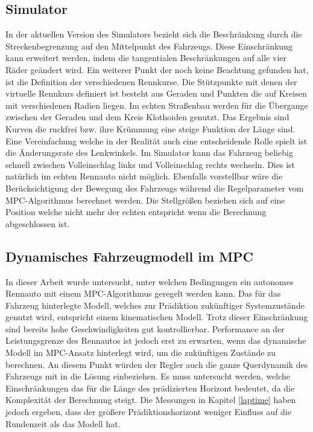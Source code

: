 \documentclass{like}
\begin{document}
\subsection{Simulator}
In der aktuellen Version des Simulators bezieht sich die Beschränkung durch die Streckenbegrenzung auf den Mittelpunkt des Fahrzeugs. Diese Einschränkung kann erweitert werden, indem die tangentialen Beschränkungen auf alle vier Räder geändert wird. Ein weiterer Punkt der noch keine Beachtung gefunden hat, ist die Definition der verschiedenen Rennkurse. Die Stützpunkte mit denen der virtuelle Rennkurs definiert ist besteht aus Geraden und Punkten die auf Kreisen mit verschiedenen Radien liegen. Im echten Straßenbau werden für die Übergange zwischen der Geraden und dem Kreis Klothoiden genutzt. Das Ergebnis sind Kurven die ruckfrei bzw. ihre Krümmung eine steige Funktion der Länge sind. Eine Vereinfachung welche in der Realität auch eine entscheidende Rolle spielt ist die Änderungsrate des Lenkwinkels. Im Simulator kann das Fahrzeug beliebig schnell zwischen Volleinschlag links und Volleinschlag rechts wechseln. Dies ist natürlich im echten Rennauto nicht möglich. Ebenfalls vorstellbar wäre die Berücksichtigung der Bewegung des Fahrzeugs während die Regelparameter vom \ac{MPC}-Algorithmus berechnet werden. Die Stellgrößen beziehen sich auf eine Position welche nicht mehr der echten entspricht wenn die Berechnung abgeschlossen ist.

\subsection{Dynamisches Fahrzeugmodell im MPC}
In dieser Arbeit wurde untersucht, unter welchen Bedingungen ein autonomes Rennauto mit einem \ac{MPC}-Algorithmus geregelt werden kann. Das für das Fahrzeug hinterlegte Modell, welches zur Prädiktion zukünftiger Systemzustände genutzt wird, entspricht einem kinematischen Modell. Trotz dieser Einschränkung sind bereits hohe Geschwindigkeiten gut kontrollierbar. Performance an der Leistungsgrenze des Rennautos ist jedoch erst zu erwarten, wenn das dynamische Modell im \ac{MPC}-Ansatz hinterlegt wird, um die zukünftigen Zustände zu berechnen. An diesem Punkt würden der Regler auch die ganze Querdynamik des Fahrzeugs mit in die Lösung einbeziehen. Es muss untersucht werden, welche Einschränkungen das für die Länge des prädizierten Horizont bedeutet, da die Komplexität der Berechnung steigt. Die Messungen in Kapitel \ref{laptime} haben jedoch ergeben, dass der größere Prädiktionshorizont weniger Einfluss auf die Rundenzeit als das Modell hat.
\end{document}

